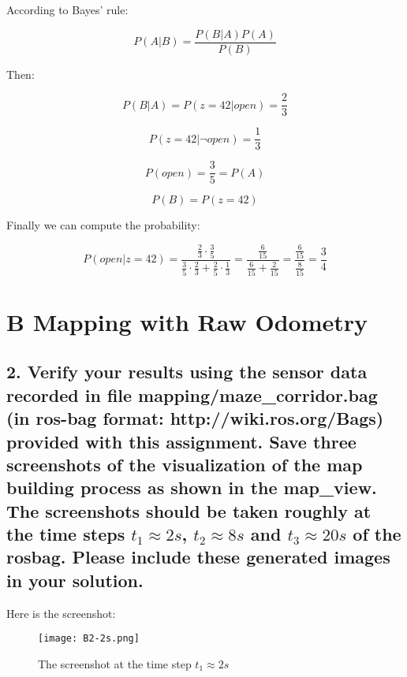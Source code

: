 \documentclass[a4paper,10pt]{article}
\begin{document}
According to Bayes' rule:

\begin{equation}
  P(A|B) = \frac{P(B|A)P(A)}{P(B)}
\end{equation}

Then:

\begin{equation}
  P(B|A) = P(z = 42 | open) = \frac{2}{3}
\end{equation}
  
\begin{equation}
  P(z = 42 | \neg{open}) = \frac{1}{3}
\end{equation}

\begin{equation}
  P(open) = \frac{3}{5} = P(A)
\end{equation}

\begin{equation}
  P(B) = P(z = 42)
\end{equation}

Finally we can compute the probability:

\begin{equation}
  P(open | z = 42) = \frac{\frac{2}{3}\cdot \frac{3}{5}}{\frac{3}{5}\cdot \frac{2}{3} + \frac{2}{5}\cdot\frac{1}{3}} = \frac{\frac{6}{15}}{\frac{6}{15}+\frac{2}{15}} = \frac{\frac{6}{15}}{\frac{8}{15}} = \frac{3}{4}
\end{equation}


\section*{B Mapping with Raw Odometry}

\subsection*{2. Verify your results using the sensor data recorded in file mapping/maze\_corridor.bag (in ros-bag format: http://wiki.ros.org/Bags) provided with this assignment. Save three screenshots of the visualization of the map building process as shown in the \textbf{map\_view}. The screenshots should be taken roughly at the time steps $t_{1}\approx 2s$, $t_{2}\approx 8s$ and $t_{3}\approx 20s$ of the rosbag. Please include these generated images in your solution.}

Here is the screenshot:

\begin{figure}[H]
  \centering
	\texttt{[image: B2-2s.png]}
	\caption{The screenshot at the time step $t_{1}\approx 2s$}
\end{figure}
\end{document}
